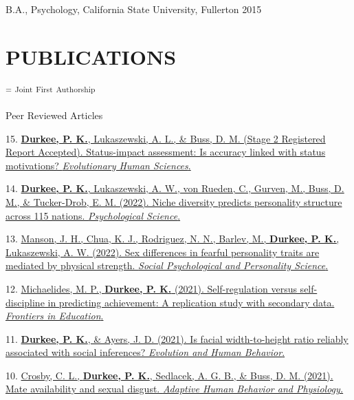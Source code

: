 \documentclass[10pt,]{article}
\begin{document}
B.A., Psychology, California State University, Fullerton
\hfill \textcolor{light-gray}{2015}

\hypertarget{publications}{%
\section{PUBLICATIONS}\label{publications}}

\textsuperscript{\faUnsorted} \textsuperscript{=}
\textsuperscript{Joint} \textsuperscript{First}
\textsuperscript{Authorship}

\textcolor{light-gray}{Peer Reviewed Articles}

15. \hangindent=0.5in \href{https://osf.io/r3s2b}{\textbf{Durkee, P.
K.}, Lukaszewski, A. L., \& Buss, D. M. (Stage 2 Registered Report
Accepted). Status-impact assessment: Is accuracy linked with status
motivations? \emph{Evolutionary Human Sciences}.}

14. \hangindent=0.5in
\href{http://www.pdurkee.com/files/pubs/Durkee_etal_2022_PsychScience.pdf}{\textbf{Durkee,
P. K.}, Lukaszewski, A. W., von Rueden, C., Gurven, M., Buss, D. M., \&
Tucker-Drob, E. M. (2022). Niche diversity predicts personality
structure across 115 nations. \emph{Psychological
Science}.\textsuperscript{\faFileTextO}}

13. \hangindent=0.5in
\href{http://www.pdurkee.com/files/pubs/Mansonetal_2022.pdf}{Manson, J.
H., Chua, K. J., Rodriguez, N. N., Barlev, M., \textbf{Durkee, P. K.},
Lukaszewski, A. W. (2022). Sex differences in fearful personality traits
are mediated by physical strength. \emph{Social Psychological and
Personality Science}. \textsuperscript{\faFileTextO}}

12. \hangindent=0.5in
\href{http://www.pdurkee.com/files/pubs/Michaelides\&Durkee.pdf}{Michaelides,
M. P., \textbf{Durkee, P. K.} (2021). Self-regulation versus
self-discipline in predicting achievement: A replication study with
secondary data. \emph{Frontiers in
Education}.\textsuperscript{\faFileTextO}}

11. \hangindent=0.5in
\href{http://www.pdurkee.com/files/pubs/Durkee\&Ayers2021_fWHR_EHB.pdf}{\textbf{Durkee,
P. K.}, \& Ayers, J. D. (2021). Is facial width-to-height ratio reliably
associated with social inferences? \emph{Evolution and Human
Behavior}.\textsuperscript{\faFileTextO}}

10. \hangindent=0.5in
\href{http://www.pdurkee.com/files/pubs/Crosby_et_al-2021-Adaptive_Human_Behavior_and_Physiology.pdf}{Crosby,
C. L.\textsuperscript{\faUnsorted}, \textbf{Durkee, P.
K.}\textsuperscript{\faUnsorted}, Sedlacek, A. G. B., \& Buss, D. M.
(2021). Mate availability and sexual disgust. \emph{Adaptive Human
Behavior and Physiology.}\textsuperscript{\faFileTextO}}
\end{document}
